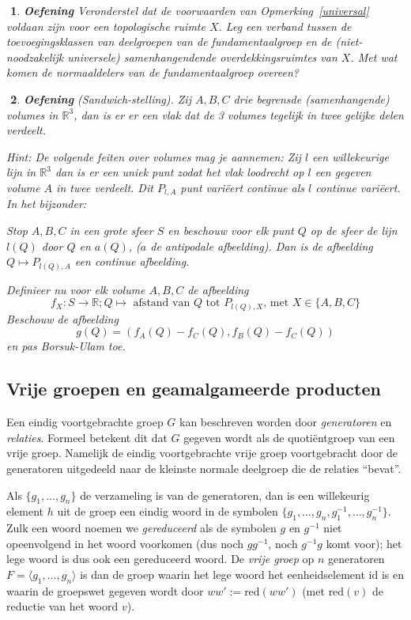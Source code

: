 \documentclass[12pt]{book}
\newcommand{\R}{\mathbb{R}}
\newcommand{\id}{\mbox{id}}
\newtheorem{eoef}{$\!\!$}[chapter]
\newenvironment{oef}{\begin{eoef} {\bf Oefening}}{\end{eoef}}
\begin{document}
\begin{oef}
Veronderstel dat de voorwaarden van Opmerking~\ref{universal} voldaan zijn voor een topologische ruimte $X$. Leg een verband tussen de toevoegingsklassen van deelgroepen van de fundamentaalgroep en de (niet-noodzakelijk universele) samenhangendende overdekkingsruimtes van $X$. Met wat komen de normaaldelers van de fundamentaalgroep overeen?
\end{oef}

\begin{oef}
(Sandwich-stelling). 
Zij $A,B,C$ drie begrensde (samenhangende) volumes in $\R^3$, dan is er er een vlak dat de 3 volumes tegelijk in twee gelijke delen verdeelt.

Hint: De volgende feiten over volumes mag je aannemen:
Zij $l$ een willekeurige lijn in $\R^3$ dan is er een uniek punt zodat het vlak loodrecht op $l$ een gegeven volume $A$ in twee verdeelt. Dit $P_{l,A}$ punt vari\"eert continue als $l$ continue vari\"eert. In het bijzonder:

Stop $A,B,C$ in een grote sfeer $S$ en beschouw voor elk punt $Q$ op de sfeer de lijn $l(Q)$ door $Q$ en $a(Q)$, ($a$ de antipodale afbeelding). Dan is de afbeelding $Q \mapsto P_{l(Q),A}$ een continue afbeelding.

Definieer nu voor elk volume $A,B,C$ de afbeelding
\begin{equation*}
f_X: S \rightarrow \R; Q \mapsto \mbox{ afstand van } Q \mbox{ tot } P_{l(Q),X} \mbox{, met }X \in \{A,B,C\} 
\end{equation*}
Beschouw de afbeelding 
\begin{equation*}
g(Q) = (f_A(Q) - f_C(Q), f_B(Q) - f_C(Q))
\end{equation*}
en pas Borsuk-Ulam toe.
\end{oef}

\subsection{Vrije groepen en geamalgameerde producten}

Een eindig voortgebrachte groep $G$
kan beschreven worden door  {\em generatoren} en  {\em relaties}. Formeel betekent dit dat $G$ gegeven
wordt als de quoti\"entgroep van een vrije groep. Namelijk de eindig voortgebrachte vrije groep voortgebracht door de
generatoren uitgedeeld naar de kleinste normale deelgroep die de relaties ``bevat''.

Als $\{g_1, \ldots , g_n\}$ de verzameling is van de generatoren, dan is een willekeurig element $h$
uit de groep een eindig woord in de symbolen $\{g_1, \ldots , g_n, g_{1}^{-1}, \ldots ,
g_{n}^{-1}\}$. Zulk een woord noemen we {\em gereduceerd} als de symbolen $g$ en $g^{-1}$ niet opeenvolgend
in het woord voorkomen (dus noch $gg^{-1}$, noch $g^{-1}g$ komt voor); het lege woord is dus ook een
gereduceerd woord. De {\em vrije groep} op $n$ generatoren $F=\langle g_1, \ldots , g_n\rangle $ is dan
de groep waarin het lege woord het eenheidselement $\id$ is en waarin de groepswet gegeven wordt door
$ww':=\mbox{red}(ww')$ (met $\mbox{red}(v)$ de reductie van het woord $v$).
\end{document}
